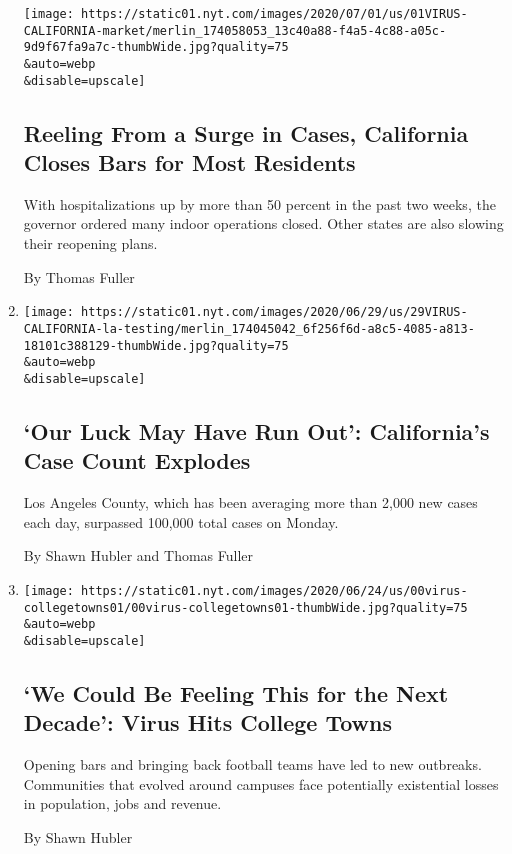 \begin{enumerate}
  \texttt{[image: https://static01.nyt.com/images/2020/07/01/us/01VIRUS-CALIFORNIA-market/merlin\_174058053\_13c40a88-f4a5-4c88-a05c-9d9f67fa9a7c-thumbWide.jpg?quality=75\\\&auto=webp\\\&disable=upscale]}

  \hypertarget{reeling-from-a-surge-in-cases-california-closes-bars-for-most-residents}{%
  \subsection{Reeling From a Surge in Cases, California Closes Bars for
  Most
  Residents}\label{reeling-from-a-surge-in-cases-california-closes-bars-for-most-residents}}

  With hospitalizations up by more than 50 percent in the past two
  weeks, the governor ordered many indoor operations closed. Other
  states are also slowing their reopening plans.

  By Thomas Fuller
\item
  \href{/2020/06/29/us/california-coronavirus-reopening.html}{}

  \texttt{[image: https://static01.nyt.com/images/2020/06/29/us/29VIRUS-CALIFORNIA-la-testing/merlin\_174045042\_6f256f6d-a8c5-4085-a813-18101c388129-thumbWide.jpg?quality=75\\\&auto=webp\\\&disable=upscale]}

  \hypertarget{our-luck-may-have-run-out-californias-case-count-explodes}{%
  \subsection{`Our Luck May Have Run Out': California's Case Count
  Explodes}\label{our-luck-may-have-run-out-californias-case-count-explodes}}

  Los Angeles County, which has been averaging more than 2,000 new cases
  each day, surpassed 100,000 total cases on Monday.

  By Shawn Hubler and Thomas Fuller
\item
  \href{/2020/06/28/us/coronavirus-college-towns.html}{}

  \texttt{[image: https://static01.nyt.com/images/2020/06/24/us/00virus-collegetowns01/00virus-collegetowns01-thumbWide.jpg?quality=75\\\&auto=webp\\\&disable=upscale]}

  \hypertarget{we-could-be-feeling-this-for-the-next-decade-virus-hits-college-towns}{%
  \subsection{`We Could Be Feeling This for the Next Decade': Virus Hits
  College
  Towns}\label{we-could-be-feeling-this-for-the-next-decade-virus-hits-college-towns}}

  Opening bars and bringing back football teams have led to new
  outbreaks. Communities that evolved around campuses face potentially
  existential losses in population, jobs and revenue.

  By Shawn Hubler
\end{enumerate}

